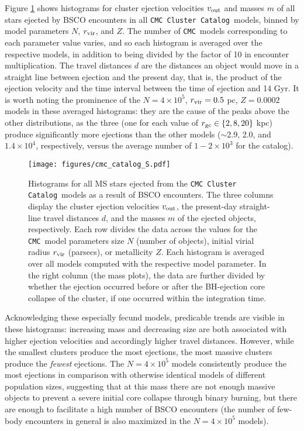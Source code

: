 \documentclass[twocolumn]{aastex631}
\newcommand{\CMC}{\texttt{CMC}}
\newcommand{\CMCcat}{\texttt{CMC Cluster Catalog}}
\begin{document}
Figure \ref{fig:cmc_catalog} shows histograms for cluster ejection velocities $v_{\rm out}$ and masses $m$ of all stars ejected by BSCO encounters in all \CMCcat\ models, binned by model parameters $N$, $r_{\rm vir}$, and $Z$.
The number of \CMC\ models corresponding to each parameter value varies, and so each histogram is averaged over the respective models, in addition to being divided by the factor of 10 in encounter multiplication.
The travel distances $d$ are the distances an object would move in a straight line between ejection and the present day, that is, the product of the ejection velocity and the time interval between the time of ejection and 14 Gyr.
It is worth noting the prominence of the $N = 4\times10^5$, $r_{\rm vir} = 0.5$ pc, $Z = 0.0002$ models in these averaged histograms: they are the cause of the peaks above the other distributions, as the three (one for each value of $r_{\rm gc} \in \{2, 8, 20\}$ kpc) produce significantly more ejections than the other models ($\sim$2.9, 2.0, and $1.4 \times 10^4$, respectively, versus the average number of $1-2 \times 10^3$ for the catalog).


\begin{figure*}
    \centering
    \texttt{[image: figures/cmc\_catalog\_S.pdf]}
    \caption{
        Histograms for all MS stars ejected from the \CMCcat\ models as a result of BSCO encounters.
        The three columns display the cluster ejection velocities $v_{\rm out}$, the present-day straight-line travel distances $d$, and the masses $m$ of the ejected objects, respectively.
        Each row divides the data across the values for the \CMC\ model parameters size $N$ (number of objects), initial virial radius $r_{\rm vir}$ (parsecs), or metallicity $Z$.
        Each histogram is averaged over all models computed with the respective model parameter.
        In the right column (the mass plots), the data are further divided by whether the ejection occurred before or after the BH-ejection core collapse of the cluster, if one occurred within the integration time.
    }
    \label{fig:cmc_catalog}
\end{figure*}

Acknowledging these especially fecund models, predicable trends are visible in these histograms: increasing mass and decreasing size are both associated with higher ejection velocities and accordingly higher travel distances.
However, while the smallest clusters produce the most ejections, the most massive clusters produce the \textit{fewest} ejections.
The $N = 4 \times 10^5$ models consistently produce the most ejections in comparison with otherwise identical models of different population sizes, suggesting that at this mass there are not enough massive objects to prevent a severe initial core collapse through binary burning, but there are enough to facilitate a high number of BSCO encounters (the number of few-body encounters in general is also maximized in the $N = 4 \times 10^5$ models).
\end{document}
